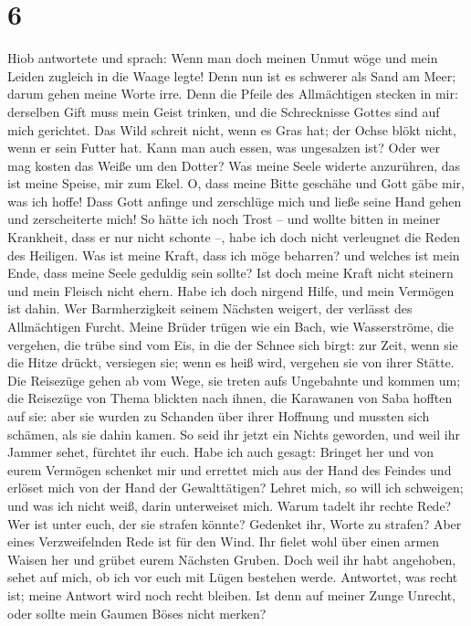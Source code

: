 \hypertarget{section-5}{%
\section{6}\label{section-5}}

 Hiob antwortete und sprach:  Wenn man doch
meinen Unmut wöge und mein Leiden zugleich in die Waage legte!
 Denn nun ist es schwerer als Sand am Meer; darum gehen
meine Worte irre.  Denn die Pfeile des Allmächtigen
stecken in mir: derselben Gift muss mein Geist trinken, und die
Schrecknisse Gottes sind auf mich gerichtet.  Das Wild
schreit nicht, wenn es Gras hat; der Ochse blökt nicht, wenn er sein
Futter hat.  Kann man auch essen, was ungesalzen ist? Oder
wer mag kosten das Weiße um den Dotter?  Was meine Seele
widerte anzurühren, das ist meine Speise, mir zum Ekel. 
O, dass meine Bitte geschähe und Gott gäbe mir, was ich hoffe!
 Dass Gott anfinge und zerschlüge mich und ließe seine
Hand gehen und zerscheiterte mich!  So hätte ich noch
Trost -- und wollte bitten in meiner Krankheit, dass er nur nicht
schonte --, habe ich doch nicht verleugnet die Reden des Heiligen.
 Was ist meine Kraft, dass ich möge beharren? und welches
ist mein Ende, dass meine Seele geduldig sein sollte? 
Ist doch meine Kraft nicht steinern und mein Fleisch nicht ehern.
 Habe ich doch nirgend Hilfe, und mein Vermögen ist
dahin.  Wer Barmherzigkeit seinem Nächsten weigert, der
verlässt des Allmächtigen Furcht.  Meine Brüder trügen
wie ein Bach, wie Wasserströme, die vergehen,  die trübe
sind vom Eis, in die der Schnee sich birgt:  zur Zeit,
wenn sie die Hitze drückt, versiegen sie; wenn es heiß wird, vergehen
sie von ihrer Stätte.  Die Reisezüge gehen ab vom Wege,
sie treten aufs Ungebahnte und kommen um;  die Reisezüge
von Thema blickten nach ihnen, die Karawanen von Saba hofften auf sie:
 aber sie wurden zu Schanden über ihrer Hoffnung und
mussten sich schämen, als sie dahin kamen.  So seid ihr
jetzt ein Nichts geworden, und weil ihr Jammer sehet, fürchtet ihr euch.
 Habe ich auch gesagt: Bringet her und von eurem Vermögen
schenket mir  und errettet mich aus der Hand des Feindes
und erlöset mich von der Hand der Gewalttätigen?  Lehret
mich, so will ich schweigen; und was ich nicht weiß, darin unterweiset
mich.  Warum tadelt ihr rechte Rede? Wer ist unter euch,
der sie strafen könnte?  Gedenket ihr, Worte zu strafen?
Aber eines Verzweifelnden Rede ist für den Wind.  Ihr
fielet wohl über einen armen Waisen her und grübet eurem Nächsten
Gruben.  Doch weil ihr habt angehoben, sehet auf mich, ob
ich vor euch mit Lügen bestehen werde.  Antwortet, was
recht ist; meine Antwort wird noch recht bleiben.  Ist
denn auf meiner Zunge Unrecht, oder sollte mein Gaumen Böses nicht
merken?

